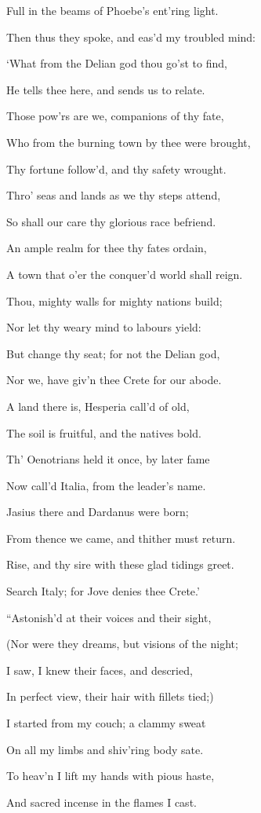 Full in the beams of Phoebe’s ent’ring light.

Then thus they spoke, and eas’d my troubled mind:

‘What from the Delian god thou go’st to find,

He tells thee here, and sends us to relate.

Those pow’rs are we, companions of thy fate,

Who from the burning town by thee were brought,

Thy fortune follow’d, and thy safety wrought.

Thro’ seas and lands as we thy steps attend,

So shall our care thy glorious race befriend.

An ample realm for thee thy fates ordain,

A town that o’er the conquer’d world shall reign.

Thou, mighty walls for mighty nations build;

Nor let thy weary mind to labours yield:

But change thy seat; for not the Delian god,

Nor we, have giv’n thee Crete for our abode.

A land there is, Hesperia call’d of old,

The soil is fruitful, and the natives bold.

Th’ Oenotrians held it once, by later fame

Now call’d Italia, from the leader’s name.

Jasius there and Dardanus were born;

From thence we came, and thither must return.

Rise, and thy sire with these glad tidings greet.

Search Italy; for Jove denies thee Crete.’

“Astonish’d at their voices and their sight,

(Nor were they dreams, but visions of the night;

I saw, I knew their faces, and descried,

In perfect view, their hair with fillets tied;)

I started from my couch; a clammy sweat

On all my limbs and shiv’ring body sate.

To heav’n I lift my hands with pious haste,

And sacred incense in the flames I cast.


